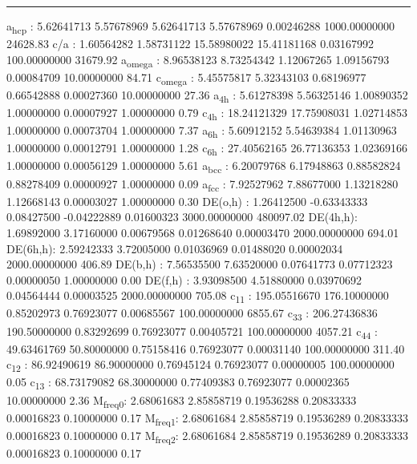 \documentclass[11pt]{article}
\begin{document}
\noindent\rule{\textwidth}{0.5pt}
a\textsubscript{hcp}   :   5.62641713   5.57678969   5.62641713   5.57678969   0.00246288 1000.00000000     24628.83
c/a     :   1.60564282   1.58731122  15.58980022  15.41181168   0.03167992 100.00000000     31679.92
a\textsubscript{omega} :   8.96538123   8.73254342   1.12067265   1.09156793   0.00084709  10.00000000        84.71
c\textsubscript{omega} :   5.45575817   5.32343103   0.68196977   0.66542888   0.00027360  10.00000000        27.36
a\textsubscript{4h}    :   5.61278398   5.56325146   1.00890352   1.00000000   0.00007927   1.00000000         0.79
c\textsubscript{4h}    :  18.24121329  17.75908031   1.02714853   1.00000000   0.00073704   1.00000000         7.37
a\textsubscript{6h}    :   5.60912152   5.54639384   1.01130963   1.00000000   0.00012791   1.00000000         1.28
c\textsubscript{6h}    :  27.40562165  26.77136353   1.02369166   1.00000000   0.00056129   1.00000000         5.61
a\textsubscript{bcc}   :   6.20079768   6.17948863   0.88582824   0.88278409   0.00000927   1.00000000         0.09
a\textsubscript{fcc}   :   7.92527962   7.88677000   1.13218280   1.12668143   0.00003027   1.00000000         0.30
DE(o,h) :   1.26412500  -0.63343333   0.08427500  -0.04222889   0.01600323 3000.00000000    480097.02
DE(4h,h):   1.69892000   3.17160000   0.00679568   0.01268640   0.00003470 2000.00000000       694.01
DE(6h,h):   2.59242333   3.72005000   0.01036969   0.01488020   0.00002034 2000.00000000       406.89
DE(b,h) :   7.56535500   7.63520000   0.07641773   0.07712323   0.00000050   1.00000000         0.00
DE(f,h) :   3.93098500   4.51880000   0.03970692   0.04564444   0.00003525 2000.00000000       705.08
c\textsubscript{11}    : 195.05516670 176.10000000   0.85202973   0.76923077   0.00685567 100.00000000      6855.67
c\textsubscript{33}    : 206.27436836 190.50000000   0.83292699   0.76923077   0.00405721 100.00000000      4057.21
c\textsubscript{44}    :  49.63461769  50.80000000   0.75158416   0.76923077   0.00031140 100.00000000       311.40
c\textsubscript{12}    :  86.92490619  86.90000000   0.76945124   0.76923077   0.00000005 100.00000000         0.05
c\textsubscript{13}    :  68.73179082  68.30000000   0.77409383   0.76923077   0.00002365  10.00000000         2.36
M\textsubscript{freq}\textsubscript{0}:   2.68061683   2.85858719   0.19536288   0.20833333   0.00016823   0.10000000         0.17
M\textsubscript{freq}\textsubscript{1}:   2.68061684   2.85858719   0.19536289   0.20833333   0.00016823   0.10000000         0.17
M\textsubscript{freq}\textsubscript{2}:   2.68061684   2.85858719   0.19536289   0.20833333   0.00016823   0.10000000         0.17
\end{document}
